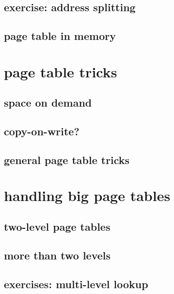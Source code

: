 

\subsection{exercise: address splitting}



\subsection{page table in memory}


\section{page table tricks}

\subsection{space on demand}


\subsection{copy-on-write?} %



\subsection{general page table tricks}




\section{handling big page tables}


\subsection{two-level page tables}



\subsection{more than two levels}


\subsection{exercises: multi-level lookup}
